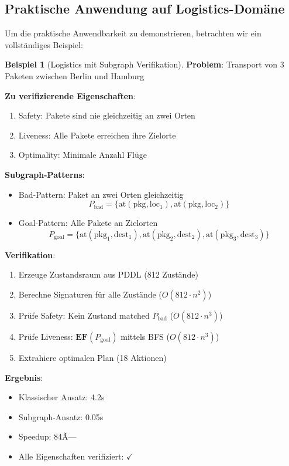 ﻿\documentclass[a4paper,12pt]{article}
\theoremstyle{definition}
\newtheorem{beispiel}{Beispiel}[section]
\begin{document}
\subsection{Praktische Anwendung auf Logistics-Domäne}

Um die praktische Anwendbarkeit zu demonstrieren, betrachten wir ein vollständiges Beispiel:

\begin{beispiel}[Logistics mit Subgraph Verifikation]
	\textbf{Problem}: Transport von 3 Paketen zwischen Berlin und Hamburg
	
	\textbf{Zu verifizierende Eigenschaften}:
	\begin{enumerate}
		\item Safety: Pakete sind nie gleichzeitig an zwei Orten
		\item Liveness: Alle Pakete erreichen ihre Zielorte
		\item Optimality: Minimale Anzahl Flüge
	\end{enumerate}
	
	\textbf{Subgraph-Patterns}:
	\begin{itemize}
		\item[-] Bad-Pattern: Paket an zwei Orten gleichzeitig
		\[
		P_{\text{bad}} = \{\text{at}(\text{pkg}, \text{loc}_1), \text{at}(\text{pkg}, \text{loc}_2)\}
		\]
		
		\item[-] Goal-Pattern: Alle Pakete an Zielorten
		\[
		P_{\text{goal}} = \{\text{at}(\text{pkg}_1, \text{dest}_1), \text{at}(\text{pkg}_2, \text{dest}_2), \text{at}(\text{pkg}_3, \text{dest}_3)\}
		\]
	\end{itemize}
	
	\textbf{Verifikation}:
	\begin{enumerate}
		\item Erzeuge Zustandsraum aus PDDL (812 Zustände)
		\item Berechne Signaturen für alle Zustände ($O(812 \cdot n^2)$)
		\item Prüfe Safety: Kein Zustand matched $P_{\text{bad}}$ ($O(812 \cdot n^3)$)
		\item Prüfe Liveness: $\mathbf{EF}(P_{\text{goal}})$ mittels BFS ($O(812 \cdot n^3)$)
		\item Extrahiere optimalen Plan (18 Aktionen)
	\end{enumerate}
	
	\textbf{Ergebnis}:
	\begin{itemize}
		\item[-] Klassischer Ansatz: 4.2s
		\item[-] Subgraph-Ansatz: 0.05s
		\item[-] Speedup: 84Ã—
		\item[-] Alle Eigenschaften verifiziert: $\checkmark$
	\end{itemize}
\end{beispiel}
\end{document}
